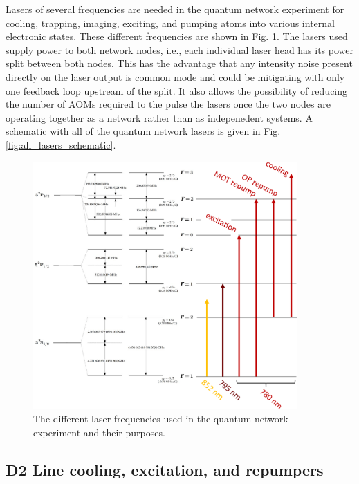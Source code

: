 Lasers of several frequencies are needed in the quantum network experiment for cooling, trapping, imaging, exciting, and pumping atoms into various internal electronic states. These different frequencies are shown in Fig. \ref{fig:laser_frequencies}. The lasers used supply power to both network nodes, i.e., each individual laser head has its power split between both nodes. This has the advantage that any intensity noise present directly on the laser output is common mode and could be mitigating with only one feedback loop upstream of the split. It also allows the possibility of reducing the number of AOMs required to the pulse the lasers once the two nodes are operating together as a network rather than as indepenedent systems. A schematic with all of the quantum network lasers is given in Fig. \ref{fig:all_lasers_schematic}. 
\begin{figure}[h!]
    \centering
    \includegraphics[width=0.9\textwidth]{Images/laser_frequencies.pdf}
    \caption{The different laser frequencies used in the quantum network experiment and their purposes.}
    \label{fig:laser_frequencies}
\end{figure}

\subsection{D2 Line cooling, excitation, and repumpers}

